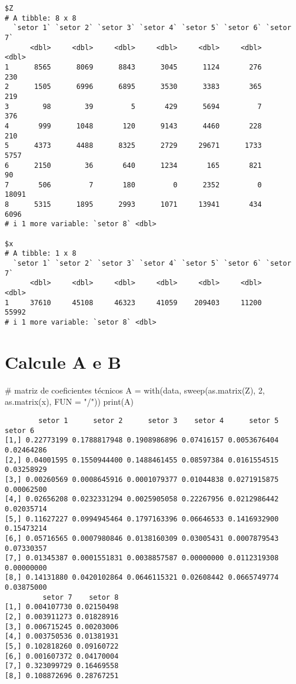 \documentclass[
  letterpaper,
  DIV=11,
  numbers=noendperiod]{scrreprt}
\newenvironment{Shaded}{\begin{snugshade}}{\end{snugshade}}
\newcommand{\AttributeTok}[1]{\textcolor[rgb]{0.80,0.80,0.80}{#1}}
\newcommand{\CommentTok}[1]{\textcolor[rgb]{0.50,0.62,0.50}{#1}}
\newcommand{\DecValTok}[1]{\textcolor[rgb]{0.86,0.86,0.80}{#1}}
\newcommand{\FunctionTok}[1]{\textcolor[rgb]{0.94,0.94,0.56}{#1}}
\newcommand{\NormalTok}[1]{\textcolor[rgb]{0.80,0.80,0.80}{#1}}
\newcommand{\OtherTok}[1]{\textcolor[rgb]{0.94,0.94,0.56}{#1}}
\newcommand{\StringTok}[1]{\textcolor[rgb]{0.80,0.58,0.58}{#1}}
\begin{document}
\begin{verbatim}
$Z
# A tibble: 8 x 8
  `setor 1` `setor 2` `setor 3` `setor 4` `setor 5` `setor 6` `setor 7`
      <dbl>     <dbl>     <dbl>     <dbl>     <dbl>     <dbl>     <dbl>
1      8565      8069      8843      3045      1124       276       230
2      1505      6996      6895      3530      3383       365       219
3        98        39         5       429      5694         7       376
4       999      1048       120      9143      4460       228       210
5      4373      4488      8325      2729     29671      1733      5757
6      2150        36       640      1234       165       821        90
7       506         7       180         0      2352         0     18091
8      5315      1895      2993      1071     13941       434      6096
# i 1 more variable: `setor 8` <dbl>

$x
# A tibble: 1 x 8
  `setor 1` `setor 2` `setor 3` `setor 4` `setor 5` `setor 6` `setor 7`
      <dbl>     <dbl>     <dbl>     <dbl>     <dbl>     <dbl>     <dbl>
1     37610     45108     46323     41059    209403     11200     55992
# i 1 more variable: `setor 8` <dbl>
\end{verbatim}

\section{Calcule A e B}\label{calcule-a-e-b}

\begin{Shaded}
\begin{Highlighting}[numbers=left,,]
\CommentTok{\# matriz de coeficientes técnicos}
\NormalTok{A }\OtherTok{=} \FunctionTok{with}\NormalTok{(data, }\FunctionTok{sweep}\NormalTok{(}\FunctionTok{as.matrix}\NormalTok{(Z), }\DecValTok{2}\NormalTok{, }\FunctionTok{as.matrix}\NormalTok{(x), }\AttributeTok{FUN =} \StringTok{"/"}\NormalTok{))}
\FunctionTok{print}\NormalTok{(A)}
\end{Highlighting}
\end{Shaded}

\begin{verbatim}
        setor 1      setor 2      setor 3    setor 4      setor 5    setor 6
[1,] 0.22773199 0.1788817948 0.1908986896 0.07416157 0.0053676404 0.02464286
[2,] 0.04001595 0.1550944400 0.1488461455 0.08597384 0.0161554515 0.03258929
[3,] 0.00260569 0.0008645916 0.0001079377 0.01044838 0.0271915875 0.00062500
[4,] 0.02656208 0.0232331294 0.0025905058 0.22267956 0.0212986442 0.02035714
[5,] 0.11627227 0.0994945464 0.1797163396 0.06646533 0.1416932900 0.15473214
[6,] 0.05716565 0.0007980846 0.0138160309 0.03005431 0.0007879543 0.07330357
[7,] 0.01345387 0.0001551831 0.0038857587 0.00000000 0.0112319308 0.00000000
[8,] 0.14131880 0.0420102864 0.0646115321 0.02608442 0.0665749774 0.03875000
         setor 7    setor 8
[1,] 0.004107730 0.02150498
[2,] 0.003911273 0.01828916
[3,] 0.006715245 0.00203006
[4,] 0.003750536 0.01381931
[5,] 0.102818260 0.09160722
[6,] 0.001607372 0.04170004
[7,] 0.323099729 0.16469558
[8,] 0.108872696 0.28767251
\end{verbatim}
\end{document}
